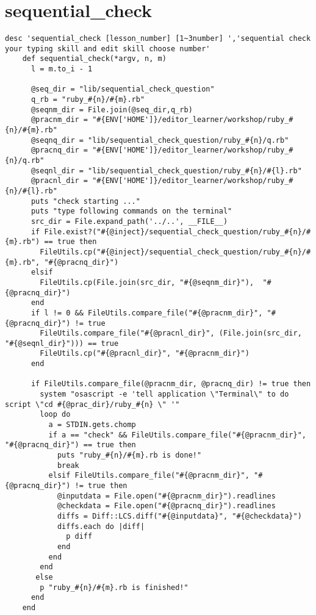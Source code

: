     \section{sequential\_check}\label{sequential_check}

\begin{verbatim}
desc 'sequential_check [lesson_number] [1~3number] ','sequential check your typing skill and edit skill choose number'
    def sequential_check(*argv, n, m)
      l = m.to_i - 1
     
      @seq_dir = "lib/sequential_check_question"
      q_rb = "ruby_#{n}/#{m}.rb"
      @seqnm_dir = File.join(@seq_dir,q_rb)
      @pracnm_dir = "#{ENV['HOME']}/editor_learner/workshop/ruby_#{n}/#{m}.rb"
      @seqnq_dir = "lib/sequential_check_question/ruby_#{n}/q.rb"
      @pracnq_dir = "#{ENV['HOME']}/editor_learner/workshop/ruby_#{n}/q.rb"      
      @seqnl_dir = "lib/sequential_check_question/ruby_#{n}/#{l}.rb"
      @pracnl_dir = "#{ENV['HOME']}/editor_learner/workshop/ruby_#{n}/#{l}.rb"      
      puts "check starting ..."
      puts "type following commands on the terminal"
      src_dir = File.expand_path('../..', __FILE__)
      if File.exist?("#{@inject}/sequential_check_question/ruby_#{n}/#{m}.rb") == true then
        FileUtils.cp("#{@inject}/sequential_check_question/ruby_#{n}/#{m}.rb", "#{@pracnq_dir}")
      elsif
        FileUtils.cp(File.join(src_dir, "#{@seqnm_dir}"),  "#{@pracnq_dir}")
      end
      if l != 0 && FileUtils.compare_file("#{@pracnm_dir}", "#{@pracnq_dir}") != true
        FileUtils.compare_file("#{@pracnl_dir}", (File.join(src_dir, "#{@seqnl_dir}"))) == true
        FileUtils.cp("#{@pracnl_dir}", "#{@pracnm_dir}")
      end
      
      if FileUtils.compare_file(@pracnm_dir, @pracnq_dir) != true then
        system "osascript -e 'tell application \"Terminal\" to do script \"cd #{@prac_dir}/ruby_#{n} \" '"
        loop do
          a = STDIN.gets.chomp
          if a == "check" && FileUtils.compare_file("#{@pracnm_dir}", "#{@pracnq_dir}") == true then
            puts "ruby_#{n}/#{m}.rb is done!"
            break
          elsif FileUtils.compare_file("#{@pracnm_dir}", "#{@pracnq_dir}") != true then
            @inputdata = File.open("#{@pracnm_dir}").readlines
            @checkdata = File.open("#{@pracnq_dir}").readlines
            diffs = Diff::LCS.diff("#{@inputdata}", "#{@checkdata}")
            diffs.each do |diff|
              p diff
            end
          end
        end
       else
        p "ruby_#{n}/#{m}.rb is finished!"
      end
    end
\end{verbatim}

